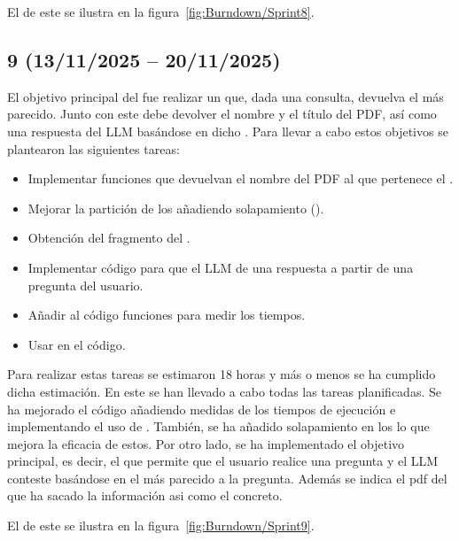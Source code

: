 El  de este  se ilustra en la figura~\ref{fig:Burndown/Sprint8}.

\subsection{ 9 (13/11/2025 -- 20/11/2025)}
El objetivo principal del  fue realizar un  que, dada una consulta, devuelva el  más parecido. Junto con este  debe devolver el nombre y el título del PDF, así como una respuesta del LLM basándose en dicho . Para llevar a cabo estos objetivos se plantearon las siguientes tareas:
\begin{itemize}
\tightlist
	\item Implementar funciones que devuelvan el nombre del PDF al que pertenece el .
	\item Mejorar la partición de los  añadiendo solapamiento ().
	\item Obtención del fragmento del .
	\item Implementar código para que el LLM de una respuesta a partir de una pregunta del usuario.
	\item Añadir al código funciones para medir los tiempos.
	\item Usar  en el código.
\end{itemize}

Para realizar estas tareas se estimaron 18 horas y más o menos se ha cumplido dicha estimación. En este  se han llevado a cabo todas las tareas planificadas. Se ha mejorado el código añadiendo medidas de los tiempos de ejecución e implementando el uso de . También, se ha añadido solapamiento en los  lo que mejora la eficacia de estos. Por otro lado, se ha implementado el objetivo principal, es decir, el  que permite que el usuario realice una pregunta y el LLM conteste basándose en el  más parecido a la pregunta. Además se indica el pdf del que ha sacado la información asi como el  concreto.

El  de este  se ilustra en la figura~\ref{fig:Burndown/Sprint9}.


